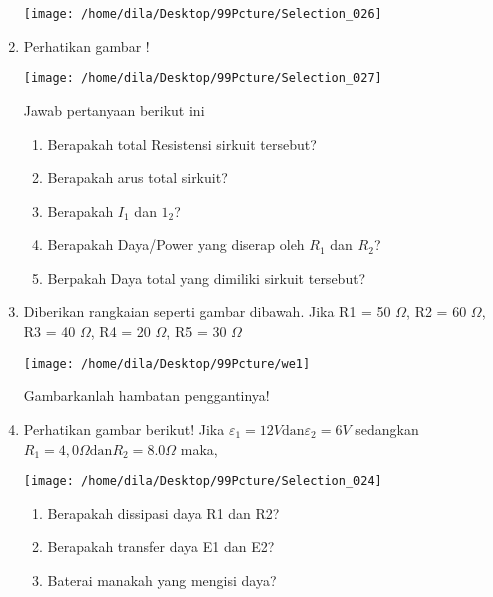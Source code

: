 \documentclass[12pt,a4paper,draft,final,oneside,twoside,openright,openany]{article}
\begin{document}
\begin{enumerate}
\begin{center}
				\texttt{[image: /home/dila/Desktop/99Pcture/Selection\_026]}
			\end{center}
	\item Perhatikan gambar !
		\begin{center}
			\texttt{[image: /home/dila/Desktop/99Pcture/Selection\_027]}
		\end{center}
		Jawab pertanyaan berikut ini
	\begin{enumerate}
		\item Berapakah total Resistensi sirkuit tersebut?
		\item Berapakah arus total sirkuit?
		\item Berapakah $I_1$ dan $1_2$?
		\item Berapakah Daya/Power yang diserap oleh $R_1$ dan $R_2$?
		\item Berpakah Daya total yang dimiliki sirkuit tersebut?
	\end{enumerate}
	\item Diberikan rangkaian seperti gambar dibawah.
		Jika R1 = 50 $\Omega$, R2 = 60 $\Omega$, R3 = 40 $\Omega$, R4 = 20 $\Omega$, R5 = 30 $\Omega$
		\begin{center}
			\texttt{[image: /home/dila/Desktop/99Pcture/we1]}
		\end{center}
	Gambarkanlah hambatan penggantinya!
	\item Perhatikan gambar berikut! Jika $\varepsilon_1=12V \text{dan} \varepsilon_2=6V$ sedangkan $R_1=4,0\Omega \text{dan} R_2=8.0 \Omega$ maka,
	 \begin{center}
		\texttt{[image: /home/dila/Desktop/99Pcture/Selection\_024]}
	\end{center}
	\begin{enumerate}
		\item Berapakah dissipasi daya R1 dan R2?
		\item Berapakah transfer daya E1 dan E2?
		\item Baterai manakah yang mengisi daya?
	\end{enumerate}
	
	\end{enumerate}
\end{document}
